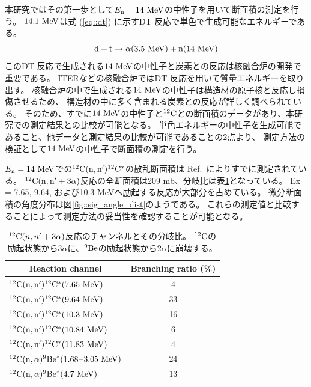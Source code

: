 本研究ではその第一歩として$E_{\rm n} = 14~{\rm MeV}$の中性子を用いて断面積の測定を行う。
$14.1~{\rm MeV}$は式 (\ref{eq::dt}) に示すDT 反応で単色で生成可能なエネルギーである。
\begin{equation}
  {\rm d} + {\rm t} \rightarrow \alpha (3.5~{\rm MeV}) + {\rm n} (14~{\rm MeV})
  \label{eq::dt}
\end{equation}
このDT 反応で生成される$14~{\rm MeV}$の中性子と炭素との反応は核融合炉の開発で重要である。
ITERなどの核融合炉ではDT 反応を用いて質量エネルギーを取り出す。
核融合炉の中で生成される$14~{\rm MeV}$の中性子は構造材の原子核と反応し損傷させるため、
構造材の中に多く含まれる炭素との反応が詳しく調べられている。
そのため、すでに$14~{\rm MeV}$の中性子と${}^{12}{\rm C}$との断面積のデータがあり、本研究での測定結果との比較が可能となる。
単色エネルギーの中性子を生成可能であること、他データと測定結果の比較が可能であることの2点より、
測定方法の検証として$14~{\rm MeV}$の中性子で断面積の測定を行う。

$E_{\rm n}=14~{\rm MeV}$での${}^{12}{\rm C}({\rm n},{\rm n}'){}^{12}{\rm C}^{*}$の散乱断面積は
Ref.~\cite{takahashietal,kondoetal}によりすでに測定されている。
${}^{12}{\rm C}({\rm n},{\rm n}'+3\alpha)$反応の全断面積は209 mb、分岐比は表\ref{tab::branchingratio}となっている。
Ex = 7.65, 9.64, および10.3 MeVへ励起する反応が大部分を占めている。
微分断面積の角度分布は図\ref{fig::sig_angle_dist}のようである。
これらの測定値と比較することによって測定方法の妥当性を確認することが可能となる。

\begin{table}
  \centering
  \caption[${}^{12}{\rm C}(n,n'+3\alpha)$反応のチャンネルとその分岐比。]
          {${}^{12}{\rm C}(n,n'+3\alpha)$反応のチャンネルとその分岐比。
  ${}^{12}{\rm C}$の励起状態から$3\alpha$に、${}^{9}{\rm Be}$の励起状態から$2\alpha$に崩壊する。}
  \label{tab::branchingratio}
  \begin{tabular}{lc}
    \toprule
    \multicolumn{1}{c}{Reaction channel} & Branching ratio (\%)\\
    \midrule
    ${}^{12}{\rm C}({\rm n},{\rm n}'){}^{12}{\rm C}^{*}(7.65~{\rm MeV})$ & 4\\
    ${}^{12}{\rm C}({\rm n},{\rm n}'){}^{12}{\rm C}^{*}(9.64~{\rm MeV})$ & 33\\
    ${}^{12}{\rm C}({\rm n},{\rm n}'){}^{12}{\rm C}^{*}(10.3~{\rm MeV})$ & 16\\
    ${}^{12}{\rm C}({\rm n},{\rm n}'){}^{12}{\rm C}^{*}(10.84~{\rm MeV})$ & 6\\
    ${}^{12}{\rm C}({\rm n},{\rm n}'){}^{12}{\rm C}^{*}(11.83~{\rm MeV})$ & 4\\
    ${}^{12}{\rm C}({\rm n},\alpha){}^{9}{\rm Be}^{*}(1.68$--$3.05~{\rm MeV})$ & 24\\
    ${}^{12}{\rm C}({\rm n},\alpha){}^{9}{\rm Be}^{*}(4.7~{\rm MeV})$ & 13\\
    \bottomrule
  \end{tabular}
\end{table}

